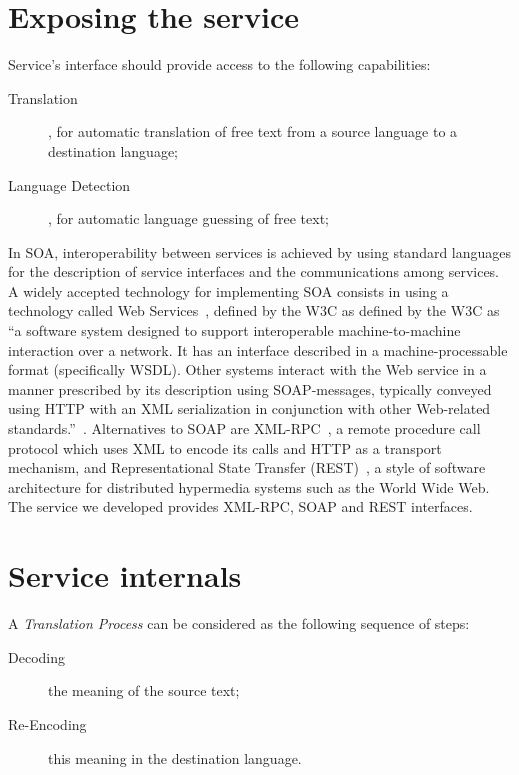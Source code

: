 \documentclass[11pt]{article}
\begin{document}
\section{Exposing the service}

Service's interface should provide access to the following capabilities:

\begin{description}
  \item[Translation], for automatic translation of free text from a source language to a destination language;
  \item[Language Detection], for automatic language guessing of free text;
\end{description}

In SOA, interoperability between services is achieved by using standard languages for the description of service interfaces and the communications
among services. A widely accepted technology for implementing SOA consists in using a technology called Web Services~\citep{soa}, defined by the W3C
as defined by the W3C as ``a software system designed to support interoperable machine-to-machine interaction over a network. It has an interface 
described in a machine-processable format (specifically WSDL). Other systems interact with the Web service in a manner prescribed by its description 
using SOAP-messages, typically conveyed using HTTP with an XML serialization in conjunction with other Web-related standards.''~\citep{wsgloss}. 
Alternatives to SOAP are XML-RPC~\citep{xmlrpcspec}, a remote procedure call protocol which uses XML to encode its calls and HTTP as a transport 
mechanism, and Representational State Transfer (REST)~\citep{rest}, a style of software architecture for distributed hypermedia systems such as 
the World Wide Web.\\

The service we developed provides XML-RPC, SOAP and REST interfaces.


\section{Service internals}

A \emph{Translation Process} can be considered as the following sequence of steps:

\begin{description}
 \item[Decoding] the meaning of the source text;
 \item[Re-Encoding] this meaning in the destination language.
\end{description}
\end{document}
